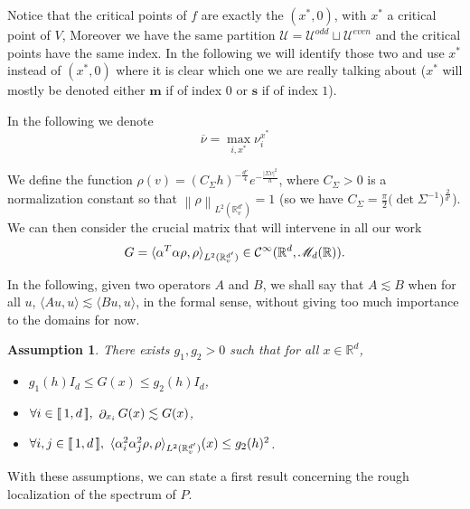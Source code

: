\documentclass[12pt]{amsart}
\newcommand{\R}{\mathbb R}
\def\<{\langle}
\def\>{\rangle}
\numberwithin{equation}{section}
\numberwithin{figure}{section}
\def\m{\mathbf{m}}
\def\s{\mathbf{s}}
\DeclareMathOperator{\p}{\partial}
\newcommand{\vvert}[1]{\left\lVert#1\right\rVert}
\newcommand{\lb}{\operatorname{[\negthinspace [}}
\newcommand{\rb}{\operatorname{]\negthinspace ]}}
\newtheorem{assumption}{Assumption}
\def\uuu{{\mathcal U}}\def\vvv{{\mathcal V}}\def\www{{\mathcal W}}\def\xxx{{\mathcal X}}
\def\Mr{{\mathscr M}}\def\Nr{{\mathscr N}}\def\Or{{\mathscr O}}\def\Pr{{\mathscr P}}
\begin{document}
Notice that the critical points of $f$ are exactly the $(x^*,0)$, with $x^*$ a critical point of $V$, Moreover we have the same partition $\uuu = \uuu^{odd}\sqcup\uuu^{even}$ and the critical points have the same index. In the following we will identify those two and use $x^*$ instead of $(x^*,0)$ where it is clear which one we are really talking about ($x^*$ will mostly be denoted either $\m$ if of index $0$ or $\s$ if of index $1$).

In the following we denote
\begin{equation}\label{eq:nubar}
\overline \nu = \max_{i,x^*}\nu_i^{x^*}
\end{equation}

We define the function $\rho(v) = (C_\Sigma h)^{-\frac{d'}{4}} e^{-\frac{|\Sigma v|^2}{h}}$, where $C_\Sigma > 0$ is a normalization constant so that $\vvert{\rho}_{L^2(\R^{d'}_v)} = 1$ (so we have $C_\Sigma = \frac{\pi}{2}\big(\det\Sigma^{-1}\big)^{\frac{2}{d'}}$). We can then consider the crucial matrix that will intervene in all our work
\begin{equation}\label{eq:defG}
G = \<\alpha^T\alpha\rho,\rho\>_{L^2(\R^{d'}_v)} \in \ccc^\infty(\R^d,\Mr_d(\R)).
\end{equation} 

In the following, given two operators $A$ and $B$, we shall say that $A\lesssim B$ when for all $u$, $\<Au,u\>\lesssim\<Bu,u\>$, in the formal sense, without giving too much importance to the domains for now.


\begin{assumption}\label{ass.G}
    There exists $g_1,g_2>0$ such that for all $x\in\R^d$,
    \begin{itemize}
        \item[$i)$] $g_1(h)I_{d} \leq G(x) \leq g_2(h)I_{d}$,
        \item[$ii)$] $\forall i\in\lb1,d\rb,\ \p_{x_i}G(x) \lesssim G(x)$,
        \item[$iii)$] $\forall i,j\in\lb1,d\rb,\ \<\alpha_i^2\alpha_j^2\rho,\rho\>_{L^2(\R_v^{d'})}(x) \leq g_2(h)^2$.
    \end{itemize}
\end{assumption}

With these assumptions, we can state a first result concerning the rough localization of the spectrum of $P$.
\end{document}
